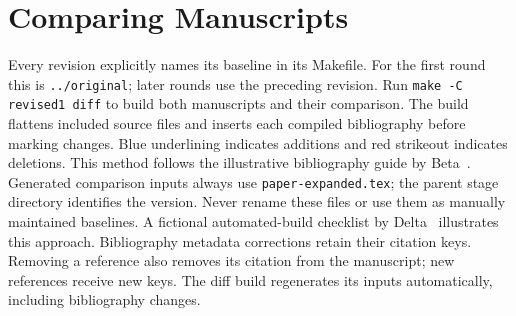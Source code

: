 \section{Comparing Manuscripts}
Every revision explicitly names its baseline in its Makefile.
For the first round this is \texttt{../original}; later rounds use the preceding revision.
Run \texttt{make -C revised1 diff} to build both manuscripts and their comparison.
The build flattens included source files and inserts each compiled bibliography
before marking changes. Blue underlining indicates additions and red strikeout indicates deletions.
This method follows the illustrative bibliography guide by Beta~\cite{bibliography}.
Generated comparison inputs always use \texttt{paper-expanded.tex}; the parent stage directory
identifies the version. Never rename these files or use them as manually maintained baselines.
A fictional automated-build checklist by Delta~\cite{automation} illustrates this approach.
Bibliography metadata corrections retain their citation keys. Removing a reference also removes
its citation from the manuscript; new references receive new keys.
The diff build regenerates its inputs automatically, including bibliography changes.

